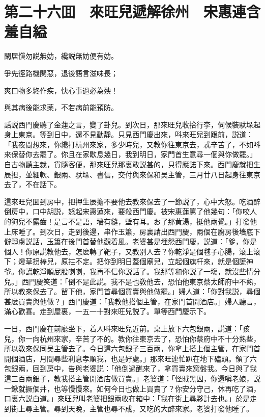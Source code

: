
\chapter*{第二十六囬　來旺兒遞解徐州　宋惠連含羞自縊}

閑居愼勿説無妨，纔説無妨便有妨。

爭先徑路機関惡，退後語言滋味長；

爽口物多終作疾，快心事過必為殃！

與其病後能求薬，不若病前能預防。

話説西門慶聽了金蓮之言，變了卦兒。到次日，那來旺兒收拾行李，伺候裝馱垛起身上東京。等到日中，還不見動靜。只見西門慶出來，呌來旺兒到跟前，説道：「我夜間想來，你纔打杭州來家，多少時兒，又教你往東京去，忒辛苦了，不如呌來保替你去罷了。你且在家歇息幾日，我到明日，家門首生意尋一個與你做罷。」自古物聽主裁，貨隨客便，那來旺兒那裏敢説甚的，只得應諾下來。西門慶就把生辰担，並細軟、銀兩、驮垛、書信，交付與來保和吴主管，三月廿八日起身往東京去了，不在話下。

這來旺兒囬到房中，把押生辰擔不要他去教來保去了一節説了，心中大怒。吃酒醉倒房中，口中胡説，怒起宋惠蓮來，要殺西門慶。被宋惠蓮罵了他幾句：「你咬人的狗兒不露齒！是言不是語，墻有縫，壁有耳。お了那黄湯，挺他兩覺。」打發他上床睡了。到次日，走到後邊，串作玉簫，房裏請出西門慶，兩個在廚房後墻底下僻靜䖏説話，玉簫在後門首替他觀着風。老婆甚是埋怨西門慶，説道：「爹，你是個人！你原説教他去，怎麽轉了靶子，又教别人去？你乾淨是個毬子心腸，滚上滚下；燈草拐棒兒，原拄不定。把你到明日蓋個廟兒，立起個旗杆來，就是個謊神爷。你謊乾淨順屁股喇喇，我再不信你説話了。我那等和你説了一塲，就沒些情分兒。」西門慶笑道：「倒不是此説。我不是也敎他去，恐怕他東京蔡太師府中不熟，所以教來保去了。㽞下他，家門首尋個買賣與他做罷。」婦人道：「你對我説，尋個甚麽買賣與他做？」西門慶道：「我教他搭個主管，在家門首開酒店。」婦人聽言，滿心歡喜。走到屋裏，一五一十對來旺兒説了。單等西門慶示下。

一日，西門慶在前廳坐下，着人呌來旺兒近前。桌上放下六包銀兩，説道：「孩兒，你一向杭州來家，辛苦了不的。教你往東京去了，恐怕你蔡府中不十分熟些，所以敎來保同吴主管去了。今日這六包銀子三百兩，你拿上搭上個主管，在家門首開個酒店，月間尋些利息孝順我，也是好處。」那來旺連忙趴在地下磕頭。領了六包銀兩，回到房中，告與老婆説：「他倒過醮來了，拿買賣來窝盤我。今日與了我這三百兩銀子，教我搭主管開酒店做買賣。」老婆道：「怪賊黑囚，你還嗔老娘，説一鍬就撅個井，也等慢慢來。如何今日也做上買賣了？你安分守己，休再吃了酒，口裏六説白道。」來旺兒叫老婆把銀兩收在箱中：「我在街上尋夥計去也。」於是走到街上尋主管。尋到天晚，主管也尋不成，又吃的大醉來家。老婆打發他睡了。

